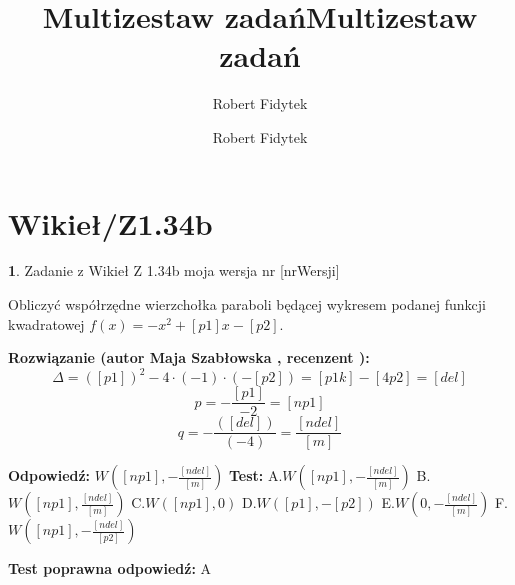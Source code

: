 \documentclass[12pt, a4paper]{article}
\title{Multizestaw zadań}
\author{Robert Fidytek}
\date{}\documentclass[12pt, a4paper]{article}
\title{Multizestaw zadań}
\author{Robert Fidytek}
\date{}
\theoremstyle{definition} %
\newtheorem{zad}{}
\theoremstyle{definition} %
\newtheorem{zad}{}
\newcommand{\kategoria}[1]{\section{#1}} %
\newcommand{\zadStart}[1]{\begin{zad}#1\newline} %
\newcommand{\zadStop}{\end{zad}}   %
\newcommand{\rozwStart}[2]{\noindent \textbf{Rozwiązanie (autor #1 , recenzent #2): }\newline} %
\newcommand{\rozwStop}{\newline}                                            %
\newcommand{\odpStart}{\noindent \textbf{Odpowiedź:}\newline}    %
\newcommand{\odpStop}{\newline}                                             %
\newcommand{\testStart}{\noindent \textbf{Test:}\newline} %
\newcommand{\testStop}{\newline} %
\newcommand{\kluczStart}{\noindent \textbf{Test poprawna odpowiedź:}\newline} %
\newcommand{\kluczStop}{\newline} %
\begin{document}
\maketitle


\kategoria{Wikieł/Z1.34b}
\zadStart{Zadanie z Wikieł Z 1.34b moja wersja nr [nrWersji]}


Obliczyć współrzędne wierzchołka paraboli będącej wykresem podanej funkcji kwadratowej $f(x)=-x^{2}+[p1]x-[p2].$
\zadStop

\rozwStart{Maja Szabłowska}{}
$$\Delta=([p1])^{2}-4\cdot(-1)\cdot(-[p2])=[p1k]-[4p2]=[del]$$
$$p=-\frac{[p1]}{-2}=[np1]$$
$$q=-\frac{([del])}{(-4)}=\frac{[ndel]}{[m]}$$


\rozwStop


\odpStart
$W([np1],-\frac{[ndel]}{[m]})$
\odpStop
\testStart
A.$W([np1],-\frac{[ndel]}{[m]})$
B.$W([np1],\frac{[ndel]}{[m]})$
C.$W([np1],0)$
D.$W([p1],-[p2])$
E.$W(0,-\frac{[ndel]}{[m]})$
F.$W([np1],-\frac{[ndel]}{[p2]})$


\testStop
\kluczStart
A
\kluczStop
\end{document}
